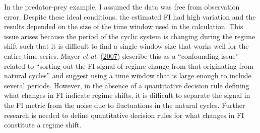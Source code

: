 \documentclass[12pt,twoside,openany]{reedthesis}
\begin{document}
In the predator-prey example, I assumed the data was free from observation error. Despite these ideal conditions, the estimated FI had high variation and the results depended on the size of the time window used in the calculation. This issue arises because the period of the cyclic system is changing during the regime shift such that it is difficult to find a single window size that works well for the entire time series. Mayer \emph{et al.} (\protect\hyperlink{ref-mayer_applications_2007}{2007}) describe this as a ``confounding issue'' related to ``sorting out the FI signal of regime change from that originating from natural cycles'' and suggest using a time window that is large enough to include several periods. However, in the absence of a quantitative decision rule defining what changes in FI indicate regime shifts, it is difficult to separate the signal in the FI metric from the noise due to fluctuations in the natural cycles. Further research is needed to define quantitative decision rules for what changes in FI constitute a regime shift.
\end{document}

